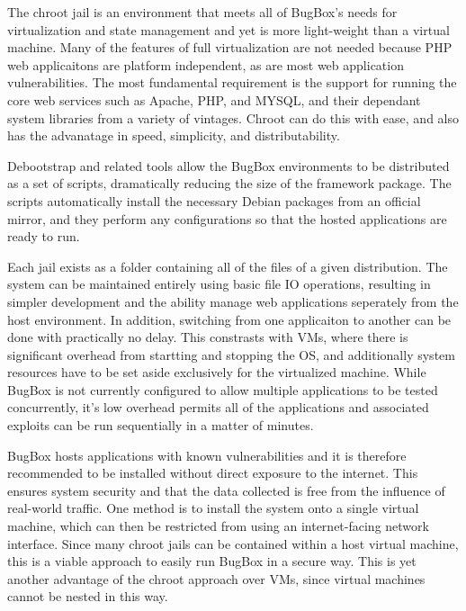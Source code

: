 \documentclass[letterpaper,twocolumn,10pt]{article}
\begin{document}
The chroot jail is an environment that meets all of BugBox's needs for virtualization and state management and yet is more light-weight than a virtual machine. Many of the features of full virtualization are not needed because PHP web applicaitons are platform independent, as are most web application vulnerabilities. The most fundamental requirement is the support for running the core web services such as Apache, PHP, and MYSQL, and their dependant system libraries from a variety of vintages. Chroot can do this with ease, and also has the advanatage in speed, simplicity, and distributability.

Debootstrap and related tools allow the BugBox environments to be distributed as a set of scripts, dramatically reducing the size of the framework package. The scripts automatically install the necessary Debian packages from an official mirror, and they perform any configurations so that the hosted applications are ready to run. 

Each jail exists as a folder containing all of the files of a given distribution. The system can be maintained entirely using basic file IO operations, resulting in simpler development and the ability manage web applications seperately from the host environment. In addition, switching from one applicaiton to another can be done with practically no delay. This constrasts with VMs, where there is significant overhead from startting and stopping the OS, and additionally system resources have to be set aside exclusively for the virtualized machine. While BugBox is not currently configured to allow multiple applications to be tested concurrently, it's low overhead permits all of the applications and associated exploits can be run sequentially in a matter of minutes. 

BugBox hosts applications with known vulnerabilities and it is therefore recommended to be installed without direct exposure to the internet. This ensures system security and that the data collected is free from the influence of real-world traffic. One method is to install the system onto a single virtual machine, which can then be restricted from using an internet-facing network interface. Since many chroot jails can be contained within a host virtual machine, this is a viable approach to easily run BugBox in a secure way. This is yet another advantage of the chroot approach over VMs, since virtual machines cannot be nested in this way.


\end{document}
